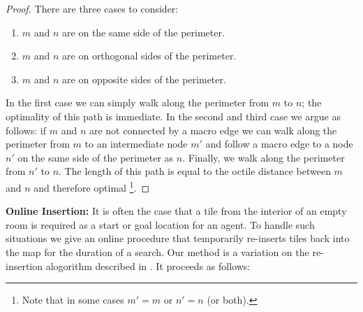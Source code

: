 \begin{proof}
There are three cases to consider:
\begin{enumerate}
\item{$m$ and $n$ are on the same side of the perimeter.}
\item{$m$ and $n$ are on orthogonal sides of the perimeter.}
\item{\label{lemma-rooms-step3} $m$ and $n$ are on opposite sides of the perimeter.}
\end{enumerate}
In the first case we can simply walk along the perimeter from $m$ to $n$; the optimality of this path is immediate. 
In the second and third case we argue as follows: if $m$ and $n$ are not connected by a macro edge
we can walk along the perimeter from $m$ to an intermediate node $m'$ and follow a macro edge to a node $n'$ on the 
same side of the perimeter as $n$. Finally, we walk along the perimeter from $n'$ to $n$.
The length of this path is equal to the octile distance between $m$ and $n$ and therefore optimal
\footnote{Note that in some cases $m' = m$ or $n' = n$ (or both).}.
\end{proof}

\noindent
\textbf{Online Insertion:}
It is often the case that a tile from the interior of an empty room is required as a start or goal location for an
agent. 
To handle such situations we give an online procedure that temporarily re-inserts tiles back into the map for the duration
of a search. 
Our method is a variation on the re-insertion alogorithm described in \cite{harabor10}. It proceeds as follows:

